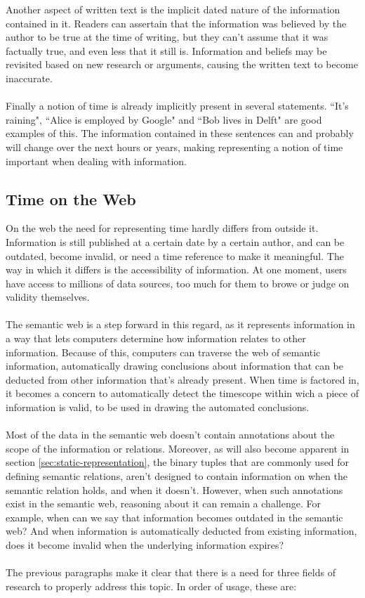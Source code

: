 \documentclass{llncs}
\begin{document}
Another aspect of written text is the implicit dated nature of the information contained in it. Readers can assertain that the information was believed by the author to be true at the time of writing, but they can't assume that it was factually true, and even less that it still is. Information and beliefs may be revisited based on new research or arguments, causing the written text to become inaccurate.\\
\\
Finally a notion of time is already implicitly present in several statements. ``It's raining", ``Alice is employed by Google" and ``Bob lives in Delft" are good examples of this. The information contained in these sentences can and probably will change over the next hours or years, making representing a notion of time important when dealing with information.


\subsection{Time on the Web}
On the web the need for representing time hardly differs from outside it. Information is still published at a certain date by a certain author, and can be outdated, become invalid, or need a time reference to make it meaningful. The way in which it differs is the accessibility of information. At one moment, users have access to millions of data sources, too much for them to browe or judge on validity themselves.\\
\\
The semantic web is a step forward in this regard, as it represents information in a way that lets computers determine how information relates to other information. Because of this, computers can traverse the web of semantic information, automatically drawing conclusions about information that can be deducted from other information that's already present. When time is factored in, it becomes a concern to automatically detect the timescope within wich a piece of information is valid, to be used in drawing the automated conclusions.\\
\\
Most of the data in the semantic web doesn't contain annotations about the scope of the information or relations. Moreover, as will also become apparent in section \ref{sec:static-representation}, the binary tuples that are commonly used for defining semantic relations, aren't designed to contain information on when the semantic relation holds, and when it doesn't. However, when such annotations exist in the semantic web, reasoning about it can remain a challenge. For example, when can we say that information becomes outdated in the semantic web? And when information is automatically deducted from existing information, does it become invalid when the underlying information expires?\\
\\
The previous paragraphs make it clear that there is a need for three fields of research to properly address this topic. In order of usage, these are:
\end{document}
